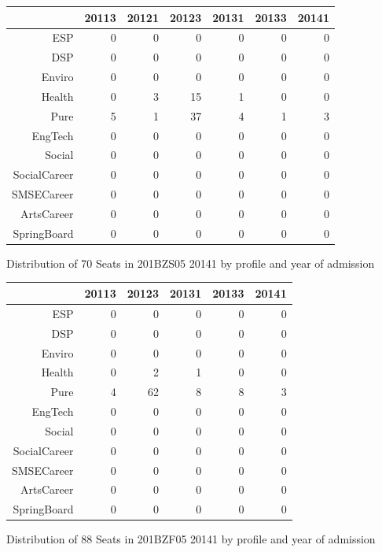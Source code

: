 \documentclass{article}\usepackage[]{graphicx}\usepackage[]{color}
\begin{document}
\begin{figure}[H]
\centering
\begin{tabular}{rrrrrrr}
  \hline
 & 20113 & 20121 & 20123 & 20131 & 20133 & 20141 \\ 
  \hline
ESP &   0 &   0 &   0 &   0 &   0 &   0 \\ 
  DSP &   0 &   0 &   0 &   0 &   0 &   0 \\ 
  Enviro &   0 &   0 &   0 &   0 &   0 &   0 \\ 
  Health &   0 &   3 &  15 &   1 &   0 &   0 \\ 
  Pure &   5 &   1 &  37 &   4 &   1 &   3 \\ 
  EngTech &   0 &   0 &   0 &   0 &   0 &   0 \\ 
  Social &   0 &   0 &   0 &   0 &   0 &   0 \\ 
  SocialCareer &   0 &   0 &   0 &   0 &   0 &   0 \\ 
  SMSECareer &   0 &   0 &   0 &   0 &   0 &   0 \\ 
  ArtsCareer &   0 &   0 &   0 &   0 &   0 &   0 \\ 
  SpringBoard &   0 &   0 &   0 &   0 &   0 &   0 \\ 
   \hline
\end{tabular}
\caption{Distribution of 70 Seats in 201BZS05 20141 by profile and year of admission} 
\end{figure}
\begin{figure}[H]
\centering
\begin{tabular}{rrrrrr}
  \hline
 & 20113 & 20123 & 20131 & 20133 & 20141 \\ 
  \hline
ESP &   0 &   0 &   0 &   0 &   0 \\ 
  DSP &   0 &   0 &   0 &   0 &   0 \\ 
  Enviro &   0 &   0 &   0 &   0 &   0 \\ 
  Health &   0 &   2 &   1 &   0 &   0 \\ 
  Pure &   4 &  62 &   8 &   8 &   3 \\ 
  EngTech &   0 &   0 &   0 &   0 &   0 \\ 
  Social &   0 &   0 &   0 &   0 &   0 \\ 
  SocialCareer &   0 &   0 &   0 &   0 &   0 \\ 
  SMSECareer &   0 &   0 &   0 &   0 &   0 \\ 
  ArtsCareer &   0 &   0 &   0 &   0 &   0 \\ 
  SpringBoard &   0 &   0 &   0 &   0 &   0 \\ 
   \hline
\end{tabular}
\caption{Distribution of 88 Seats in 201BZF05 20141 by profile and year of admission} 
\end{figure}
\end{document}

